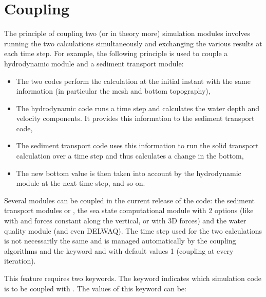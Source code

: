 \section{Coupling}
\label{sec:coupling}

The principle of coupling two (or in theory more) simulation modules involves
running the two calculations simultaneously and exchanging the various results
at each time step.
For example, the following principle is used to couple a hydrodynamic module
and a sediment transport module:

\begin{itemize}
\item The two codes perform the calculation at the initial instant
with the same information (in particular the mesh and bottom topography),

\item The hydrodynamic code runs a time step and calculates the water depth
and velocity components.
It provides this information to the sediment transport code,

\item The sediment transport code uses this information to run the solid
transport calculation over a time step and thus calculates a change in the
bottom,

\item The new bottom value is then taken into account by the hydrodynamic module
at the next time step, and so on.
\end{itemize}

Several modules can be coupled in the current release of the code:
the sediment transport modules \gaia or \sisyphe,
the sea state computational module \tomawac with 2 options (like with
 and forces constant along the vertical, or with 3D forces)
and the water quality module \waqtel (and even DELWAQ).
The time step used for the two calculations is not necessarily the same and is
managed automatically by the coupling algorithms
and the keyword  and
 with default values 1
(coupling at every iteration).

This feature requires two keywords.
The keyword  indicates which simulation code is to be
coupled with .
The values of this keyword can be:

